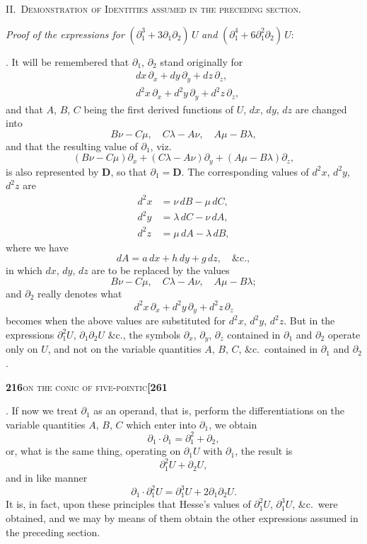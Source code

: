 \documentclass[11pt]{article}
\begin{document}
\bigskip

\begin{center}
\textsc{II.\ Demonstration of Identities assumed in the preceding section.}
\end{center}

\medskip

\noindent\textit{Proof of the expressions for} $(\partial_1^3 + 3\partial_1\partial_2)\,U$ \textit{and} $(\partial_1^4 + 6\partial_1^2\partial_2)\,U$:

\medskip

. It will be remembered that $\partial_1$, $\partial_2$ stand originally for
\[
\begin{aligned}
&dx\,\partial_x + dy\,\partial_y + dz\,\partial_z,\\
&d^2x\,\partial_x + d^2y\,\partial_y + d^2z\,\partial_z,
\end{aligned}
\]
and that $A$, $B$, $C$ being the first derived functions of $U$, $dx$, $dy$, $dz$ are changed into
\[
B\nu - C\mu,\quad C\lambda - A\nu,\quad A\mu - B\lambda,
\]
and that the resulting value of $\partial_1$, viz.
\[
(B\nu - C\mu)\partial_x + (C\lambda - A\nu)\partial_y + (A\mu - B\lambda)\partial_z,
\]
is also represented by $\mathbf{D}$, so that $\partial_1 = \mathbf{D}$. The corresponding values of $d^2x$, $d^2y$, $d^2z$ are
\[
\begin{aligned}
d^2x &= \nu\,dB - \mu\,dC,\\
d^2y &= \lambda\,dC - \nu\,dA,\\
d^2z &= \mu\,dA - \lambda\,dB,
\end{aligned}
\]
where we have
\[
dA = a\,dx + h\,dy + g\,dz,\quad \&\text{c.},
\]
in which $dx$, $dy$, $dz$ are to be replaced by the values
\[
B\nu - C\mu,\quad C\lambda - A\nu,\quad A\mu - B\lambda;
\]
and $\partial_2$ really denotes what
\[
d^2x\,\partial_x + d^2y\,\partial_y + d^2z\,\partial_z
\]
becomes when the above values are substituted for $d^2x$, $d^2y$, $d^2z$. But in the expressions $\partial_1^2 U$, $\partial_1\partial_2 U$ \&c., the symbols $\partial_x$, $\partial_y$, $\partial_z$ contained in $\partial_1$ and $\partial_2$ operate only on $U$, and not on the variable quantities $A$, $B$, $C$, \&c.\ contained in $\partial_1$ and $\partial_2$.

\newpage

\noindent\textbf{216}\hfill\textsc{on the conic of five-pointic}\hfill\textbf{[261}

\medskip

. If now we treat $\partial_1$ as an operand, that is, perform the differentiations on the variable quantities $A$, $B$, $C$ which enter into $\partial_1$, we obtain
\[
\partial_1 \cdot \partial_1 = \partial_1^2 + \partial_2,
\]
or, what is the same thing, operating on $\partial_1 U$ with $\partial_1$, the result is
\[
\partial_1^2 U + \partial_2 U,
\]
and in like manner
\[
\partial_1 \cdot \partial_1^2 U = \partial_1^3 U + 2\partial_1\partial_2 U.
\]
It is, in fact, upon these principles that Hesse's values of $\partial_1^2 U$, $\partial_1^3 U$, \&c.\ were obtained, and we may by means of them obtain the other expressions assumed in the preceding section.
\end{document}
